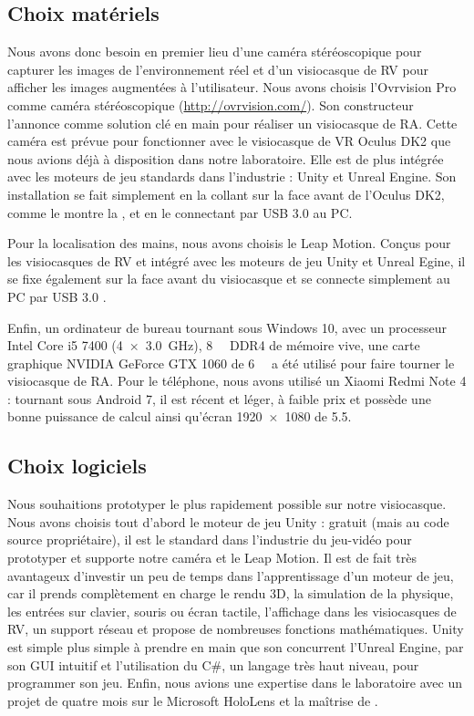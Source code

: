 \subsection{Choix matériels}
\label{subsec:hardware_choices}
Nous avons donc besoin en premier lieu d'une caméra stéréoscopique  pour capturer les images de l'environnement réel et d'un visiocasque de RV pour afficher les images augmentées à l'utilisateur. Nous avons choisis l'Ovrvision Pro comme caméra stéréoscopique (\url{http://ovrvision.com/}). Son constructeur l'annonce comme solution clé en main pour réaliser un visiocasque de RA. Cette caméra est prévue pour fonctionner avec le visiocasque de VR Oculus DK2 que nous avions déjà à disposition dans notre laboratoire. Elle est de plus intégrée avec les moteurs de jeu standards dans l'industrie : Unity et Unreal Engine. Son installation se fait simplement en la collant sur la face avant de l'Oculus DK2, comme le montre la , et en le connectant par USB 3.0 au PC.

Pour la localisation des mains, nous avons choisis le Leap Motion. Conçus pour les visiocasques de RV et intégré avec les moteurs de jeu Unity et Unreal Egine, il se fixe également sur la face avant du visiocasque et se connecte simplement au PC par USB 3.0 .

Enfin, un ordinateur de bureau tournant sous Windows 10, avec un processeur Intel Core i5 7400 (\SI[product-units = single]{4x3.0}{\GHz}), \SI{8}{\giga\byte} DDR4 de mémoire vive, une carte graphique NVIDIA GeForce GTX 1060 de \SI{6}{\giga\byte} a été utilisé pour faire tourner le visiocasque de RA. Pour le téléphone, nous avons utilisé un Xiaomi Redmi Note 4 : tournant sous Android 7, il est récent et léger, à faible prix et possède une bonne puissance de calcul ainsi qu'écran \SI{1920x1080}{\px} de \SI{5.5}{\inch}.

\subsection{Choix logiciels}
\label{subsec:software_choices}
Nous souhaitions prototyper le plus rapidement possible sur notre visiocasque. Nous avons choisis tout d'abord le moteur de jeu Unity : gratuit (mais au code source propriétaire), il est le standard dans l'industrie du jeu-vidéo pour prototyper et supporte notre caméra et le Leap Motion. Il est de fait très avantageux d'investir un peu de temps dans l'apprentissage d'un moteur de jeu, car il prends complètement en charge le rendu 3D, la simulation de la physique, les entrées sur clavier, souris ou écran tactile, l'affichage dans les visiocasques de RV, un support réseau et propose de nombreuses fonctions mathématiques. Unity est simple plus simple à prendre en main que son concurrent l'Unreal Engine, par son GUI intuitif et l'utilisation du C\#, un langage très haut niveau, pour programmer son jeu. Enfin, nous avions une expertise dans le laboratoire avec un projet de quatre mois sur le Microsoft HoloLens et la maîtrise de \cite{Millette2016}.

